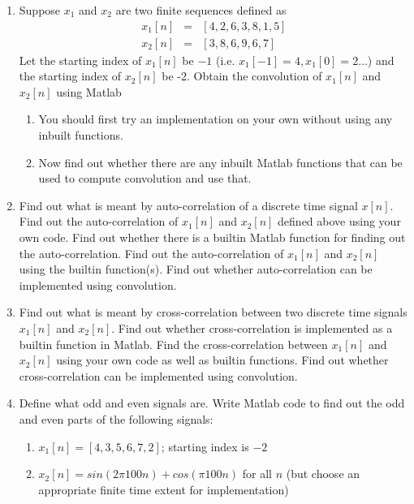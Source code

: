 \begin{enumerate}
\item Suppose $x_{1}$ and $x_{2}$ are two finite sequences defined as
  \begin{eqnarray*}
    x_{1}[n] & = & [4,2,6,3,8,1,5] \\
    x_{2}[n] & = & [3,8,6,9,6,7]
  \end{eqnarray*}
  Let the starting index of $x_{1}[n]$ be $-1$ (i.e. $x_{1}[-1] = 4, x_{1}[0] = 2 \dots$) and the starting index of $x_{2}[n]$ be -2.
  Obtain the convolution of $x_{1}[n]$ and $x_{2}[n]$ using Matlab
  \begin{enumerate}
  \item You should first try an implementation on your own without using any inbuilt functions.
  \item Now find out whether there are any inbuilt Matlab functions that can be used to compute convolution and use that.
  \end{enumerate}
\item Find out what is meant by auto-correlation of a discrete time signal $x[n]$. Find out the auto-correlation of $x_{1}[n]$ and $x_{2}[n]$ defined above using your own code. Find out whether there is a builtin Matlab function for finding out the auto-correlation. Find out the auto-correlation of $x_{1}[n]$ and $x_{2}[n]$ using the builtin function(s). Find out whether auto-correlation can be implemented using convolution.
\item Find out what is meant by cross-correlation between two discrete time signals $x_{1}[n]$ and $x_{2}[n]$. Find out whether cross-correlation is implemented as a builtin function in Matlab. Find the cross-correlation between $x_{1}[n]$ and $x_{2}[n]$ using your own code as well as builtin functions. Find out whether cross-correlation can be implemented using convolution.
\item Define what odd and even signals are. Write Matlab code to find out the odd and even parts of the following signals:
  \begin{enumerate}
  \item $x_{1}[n] = [4, 3, 5, 6, 7, 2]$; starting index is $-2$
  \item $x_{2}[n] = sin(2\pi 100n) + cos(\pi 100 n)$ for all $n$ (but choose an appropriate finite time extent for implementation)
  \end{enumerate}



\end{enumerate}
